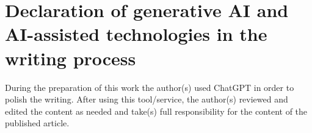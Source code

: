 \documentclass[preprint,12pt,authoryear]{elsarticle}
\begin{document}
\section*{Declaration of generative AI and AI-assisted technologies in the writing process}

During the preparation of this work the author(s) used ChatGPT in order to polish the writing. After using this tool/service, the author(s) reviewed and edited the content as needed and take(s) full responsibility for the content of the published article.

\FloatBarrier


\FloatBarrier


\end{document}

